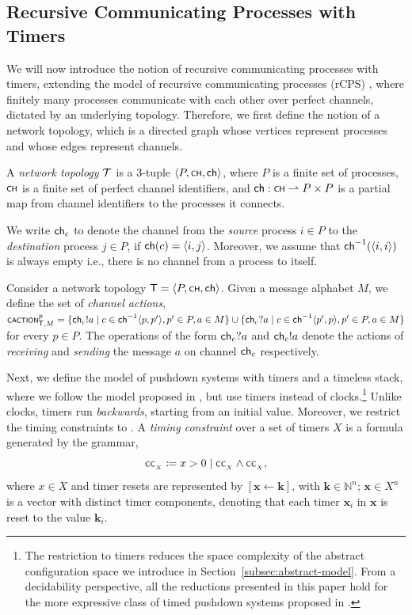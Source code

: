 \subsection{Recursive Communicating Processes with Timers\label{subsec:trcps}}
We will now introduce the notion of recursive communicating processes with timers, extending the model of recursive communicating processes (rCPS) \cite{heussner2010reachability,heussner2012reachability}, where finitely many processes communicate with each other over perfect channels, dictated by an underlying topology. Therefore, we first define the notion of a network topology, which is a directed graph whose vertices represent processes and whose edges represent channels.
\begin{definition}
	A \emph{network topology} $\cal T$ is a 3-tuple $\tup{P,\scrsf{ch},\ch}$, where $P$ is a finite set of processes, $\scrsf{ch}$ is a finite set of perfect channel identifiers, and $\ch : \scrsf{ch} \rightharpoonup P \times P$ is a partial map from channel identifiers to the processes it connects.
	
	We write $\ch_{c}$ to denote the channel from the \emph{source} process $i \in P$ to the \emph{destination} process $j \in P$, if $\ch(c) = \tup{i,j}$. Moreover, we assume that $\ch^{-1}(\tup{i,i})$ is always empty i.e., there is no channel from a process to itself.
\end{definition}

Consider a network topology $\mathsf T = \tup{P,\scrsf{ch},\ch}$. Given a message alphabet $M$, we define the set of \emph{channel actions}, $\scrsf{caction}_{\mathsf T,M}^p = \{\ch_c!a \mid c \in \ch^{-1}\tup{p,p'}, p'\in P, a \in M\} \cup \{\ch_c?a \mid c \in \ch^{-1}\tup{p',p}, p'\in P, a \in M\}$ for every $p \in P$. The operations of the form $\ch_c?a$ and $\ch_{c}!a$ denote the actions of \emph{receiving} and \emph{sending} the message $a$ on channel $\ch_c$ respectively. 

Next, we define the model of pushdown systems with timers and a timeless stack, where we follow the model proposed in \cite[\S 2]{clemente2015timed}, but use timers \cite{vaandrager2023learning,KuroseRoss16} instead of clocks.\footnote{The restriction to timers reduces the space complexity of the abstract configuration space we introduce in Section~\ref{subsec:abstract-model}. From a decidability perspective, all the reductions presented in this paper hold for the more expressive class of timed pushdown systems proposed in \cite{clemente2015timed}.} Unlike clocks, timers run \emph{backwards}, starting from an initial value. Moreover, we restrict the timing constraints to . A \emph{timing constraint} over a set of timers $X$ is a formula generated by the grammar,
\[ \scrsf{cc}\subsub{X} \coloneqq x > 0 \mid \scrsf{cc}\subsub{X} \wedge \scrsf{cc}\subsub{X},\]
where $x\in X$ and timer resets are represented by $[\mathbf{x} \leftarrow \mathbf{k}]$, with $\mathbf{k} \in \mathbb{N}^n$; $\mathbf{x}\in X^n$ is a vector with distinct timer components, denoting that each timer $\mathbf{x}_i$ in $\mathbf{x}$ is reset to the value $\mathbf{k}_i$.

